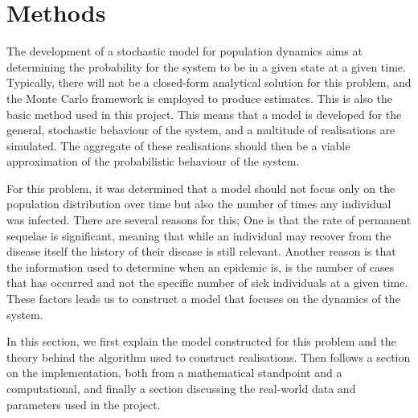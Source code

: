 \documentclass[10pt,a4paper]{article}
\begin{document}


\section{Methods}

The development of a stochastic model for population dynamics aims at determining the probability for the system to be in a given state at a given time. Typically, there will not be a closed-form analytical solution for this problem, and the Monte Carlo framework is employed to produce estimates. This is also the basic method used in this project. This means that a model is developed for the general, stochastic behaviour of the system, and a multitude of realisations are simulated. The aggregate of these realisations should then be a viable approximation of the probabilistic behaviour of the system.

For this problem, it was determined that a model should not focus only on the population distribution over time but also the number of times any individual was infected. There are several reasons for this; One is that the rate of permanent sequelae is significant, meaning that while an individual may recover from the disease itself the history of their disease is still relevant. Another reason is that the information used to determine when an epidemic is, is the number of cases that has occurred and not the specific number of sick individuals at a given time. These factors leads us to construct a model that focuses on the dynamics of the system.

In this section, we first explain the model constructed for this problem and the theory behind the algorithm used to construct realisations. Then follows a section on the implementation, both from a mathematical standpoint and a computational, and finally a section discussing the real-world data and parameters used in the project.

%
%
\end{document}

